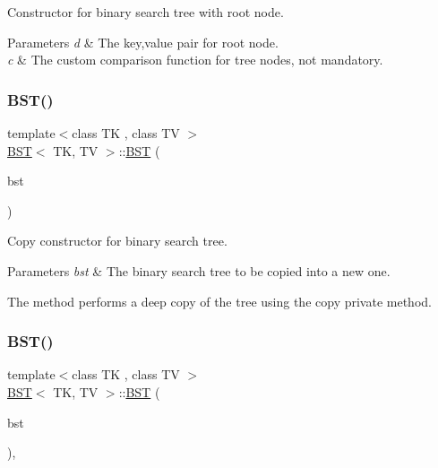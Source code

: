 Constructor for binary search tree with root node. 


\begin{DoxyParams}{Parameters}
{\em d} & The key,value pair for root node. \\
\hline
{\em c} & The custom comparison function for tree nodes, not mandatory. \\
\hline
\end{DoxyParams}
\mbox{\label{classBST_a2362c8e6d3746ed7480d5a920902a067}} 
\subsubsection{\texorpdfstring{B\+S\+T()}{BST()}\hspace{0.1cm}{\footnotesize\ttfamily [2/3]}}
{\footnotesize\ttfamily template$<$class TK , class TV $>$ \\
\hyperlink{classBST}{B\+ST}$<$ TK, TV $>$\+::\hyperlink{classBST}{B\+ST} (\begin{DoxyParamCaption}\item[{const \hyperlink{classBST}{B\+ST}$<$ TK, TV $>$ \&}]{bst }\end{DoxyParamCaption})\hspace{0.3cm}{\ttfamily [inline]}}



Copy constructor for binary search tree. 


\begin{DoxyParams}{Parameters}
{\em bst} & The binary search tree to be copied into a new one.\\
\hline
\end{DoxyParams}
The method performs a deep copy of the tree using the copy private method. \mbox{\label{classBST_a291e3ac348c04e55fe432e4dc9ce05c9}} 
\subsubsection{\texorpdfstring{B\+S\+T()}{BST()}\hspace{0.1cm}{\footnotesize\ttfamily [3/3]}}
{\footnotesize\ttfamily template$<$class TK , class TV $>$ \\
\hyperlink{classBST}{B\+ST}$<$ TK, TV $>$\+::\hyperlink{classBST}{B\+ST} (\begin{DoxyParamCaption}\item[{\hyperlink{classBST}{B\+ST}$<$ TK, TV $>$ \&\&}]{bst }\end{DoxyParamCaption})\hspace{0.3cm}{\ttfamily [inline]}, {\ttfamily [noexcept]}}



